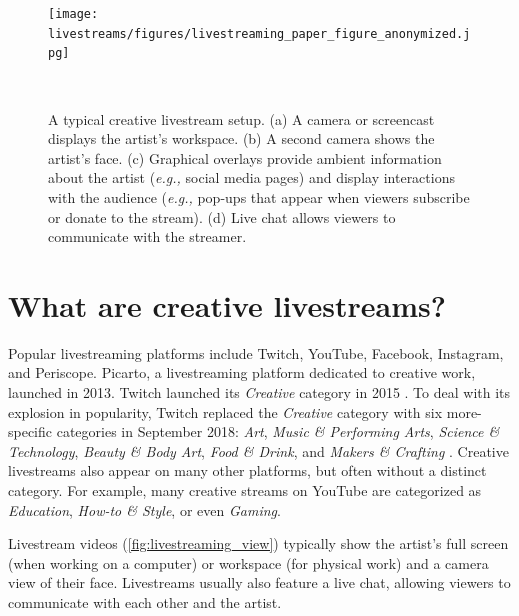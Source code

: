 \begin{figure}[b]
\centering
  \texttt{[image: livestreams/figures/livestreaming\_paper\_figure\_anonymized.jpg]}
  \caption{A typical creative livestream setup. (a) A camera or screencast displays the artist's workspace. (b) A second camera shows the artist's face. (c) Graphical overlays provide ambient information about the artist (\textit{e.g.,} social media pages) and display interactions with the audience (\textit{e.g.,} pop-ups that appear when viewers subscribe or donate to the stream). (d) Live chat allows viewers to communicate with the streamer. }~\label{fig:livestreaming_view}
  \vspace{-0.15in}
\end{figure}

\section{What are creative livestreams?}
Popular livestreaming platforms include Twitch, YouTube, Facebook, Instagram, and Periscope. Picarto, a livestreaming platform dedicated to creative work, launched in 2013. Twitch launched its \textit{Creative} category in 2015 \cite{Moorier2015}. To deal with its explosion in popularity, Twitch replaced the \textit{Creative} category with six more-specific categories in September 2018: \textit{Art}, \textit{Music \& Performing Arts}, \textit{Science \& Technology}, \textit{Beauty \& Body Art}, \textit{Food \& Drink}, and \textit{Makers \& Crafting} \cite{Robertson2018}. 
Creative livestreams also appear on many other platforms, but often without a distinct category. For example, many creative streams on YouTube are categorized as \textit{Education}, \textit{How-to \& Style}, or even \textit{Gaming}.

Livestream videos (\autoref{fig:livestreaming_view}) typically show the artist's full screen (when working on a computer) or workspace (for physical work) and a camera view of their face. Livestreams usually also feature a live chat, allowing viewers to communicate with each other and the artist. 

